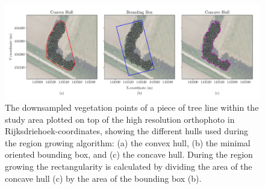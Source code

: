 
\begin{figure}
	\centering
	\includegraphics[width=\columnwidth]{./img/hulls.pdf}
	\caption{The downsampled vegetation points of a piece of tree line within the study area  plotted on top of the high resolution orthophoto in Rijksdriehoek-coordinates, showing the different hulls used during the region growing algorithm: (a) the convex hull, (b) the minimal oriented bounding box, and (c) the concave hull. During the region growing the rectangularity is calculated by dividing the area of the concave hull (c) by the area of the bounding box (b).}
	\label{fig:hulls}
\end{figure}


